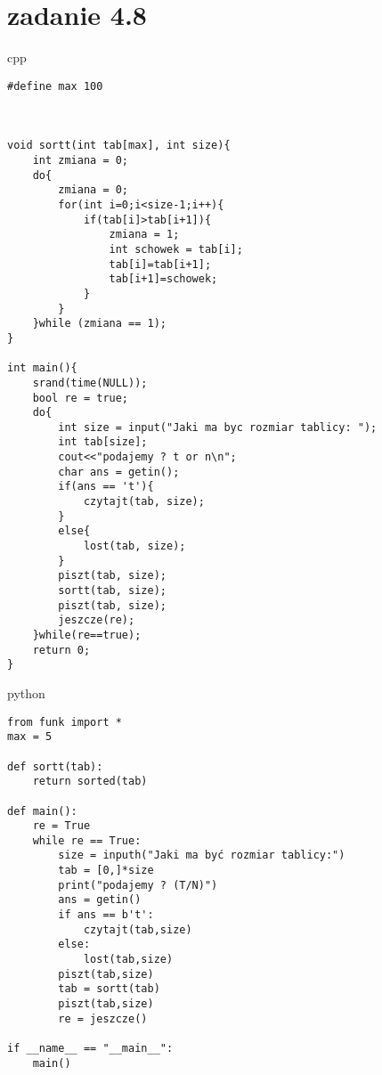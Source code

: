 \documentclass{article}
\begin{document}
\section*{zadanie 4.8}

\begin{temp}{\large cpp}  
\begin{verbatim}
#define max 100



void sortt(int tab[max], int size){
    int zmiana = 0;
    do{
        zmiana = 0;
        for(int i=0;i<size-1;i++){
            if(tab[i]>tab[i+1]){
                zmiana = 1;
                int schowek = tab[i];
                tab[i]=tab[i+1];
                tab[i+1]=schowek;
            }
        }
    }while (zmiana == 1);
}

int main(){
    srand(time(NULL));
    bool re = true;
    do{
        int size = input("Jaki ma byc rozmiar tablicy: ");        
        int tab[size];
        cout<<"podajemy ? t or n\n";
        char ans = getin();
        if(ans == 't'){
            czytajt(tab, size);
        }
        else{
            lost(tab, size);
        }
        piszt(tab, size);
        sortt(tab, size);
        piszt(tab, size);
        jeszcze(re);
    }while(re==true);
    return 0;
}

\end{verbatim}
\end{temp}

\begin{temp}{\large python}  
\begin{verbatim}
from funk import *
max = 5

def sortt(tab):
    return sorted(tab)

def main():
    re = True
    while re == True:
        size = inputh("Jaki ma być rozmiar tablicy:")
        tab = [0,]*size
        print("podajemy ? (T/N)")
        ans = getin()
        if ans == b't':
            czytajt(tab,size)
        else:
            lost(tab,size)
        piszt(tab,size)
        tab = sortt(tab)
        piszt(tab,size)
        re = jeszcze()

if __name__ == "__main__":
    main()

\end{verbatim}
\end{temp}
\end{document}
